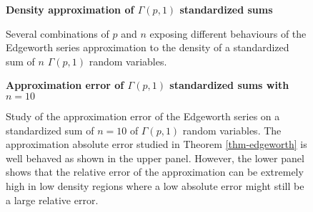 \begin{example}
    \begin{figure}[h]
        \textbf{Density approximation of $\Gamma(p,1)$ standardized sums}
        \centering
        \qquad
        \caption{Several combinations of $p$ and $n$ exposing different behaviours of the Edgeworth series approximation to the density of a standardized sum of $n$ $\Gamma(p, 1)$ random variables.}
        \label{fig-edgeworth}
    \end{figure}

    \begin{figure}[h]
        \textbf{Approximation error of $\Gamma(p,1)$ standardized sums with $n=10$}
        \centering
        \qquad
        \caption{Study of the approximation error of the Edgeworth series on a standardized sum of $n=10$ of $\Gamma(p, 1)$ random variables. The approximation absolute error studied in Theorem \ref{thm-edgeworth} is well behaved as shown in the upper panel. However, the lower panel shows that the relative error of the approximation can be extremely high in low density regions where a low absolute error might still be a large relative error.}
        \label{fig-edgeworth-err}
    \end{figure}

    
    
\end{example}